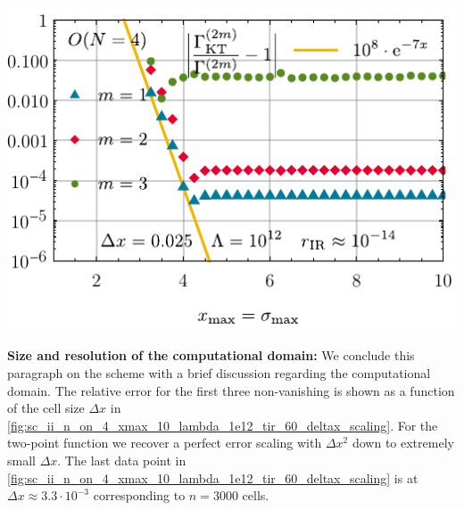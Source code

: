 	{%
		\vspace{-0.2cm}
		\includegraphics[width=\subcaptionFigureWidth+0.04cm]{0d/figures/sc_ii_n_on_4_deltax_25e-3_lambda_1e12_tir_60_errors_xmax.pdf} %
		\captionsetup{width=\subcaptionFigureWidth+0.04cm}%
		\caption{%
			The relative error for $\Gamma^{(2m)}$ for $m = 1, 2, 3$ for the \uv{} potential \eqref{eq:testing_scenario_phi4} of the $O ( 4 )$ model as a function of $x_\mathrm{max}$, keeping the cell size $\Delta x = 0.025$ constant.
			$\Gamma^{(2m)}$ are computed from the discrete values of the derivative of the \ir{} potential $u ( t_\mathrm{IR} = 60, \sigma )$ via the second-order accurate central finite-difference stencils \eqref{eq:derivative_1_central_error_2}, \eqref{eq:derivative_3_central_error_2}, and \eqref{eq:derivative_5_central_error_2} at $\sigma = 0$.
			We used the exponential regulator~\eqref{eq:exponential_regulator} with \uv{} scale $\Lambda = 10^{12}$.
			The yellow straight line $\propto\exp\del{-7\,x_\mathrm{max}}$ is for optical guidance.
		}%
		\label{fig:sc_ii_n_on_4_deltax_25e-3_lambda_1e12_tir_60_errors_xmax}
	}
\textbf{Size and resolution of the computational domain:} We conclude this paragraph on the \kt{} scheme with a brief discussion regarding the computational domain.
The relative error for the first three non-vanishing \nptFunctions{} is shown as a function of the cell size $\Delta x$ in \cref{fig:sc_ii_n_on_4_xmax_10_lambda_1e12_tir_60_deltax_scaling}.
For the two-point function we recover a perfect error scaling with $\Delta x^2$ down to extremely small $\Delta x$.
The last data point in \cref{fig:sc_ii_n_on_4_xmax_10_lambda_1e12_tir_60_deltax_scaling} is at ${\Delta x \approx 3.3 \cdot 10^{-3}}$ corresponding to $n=3000$ cells.

